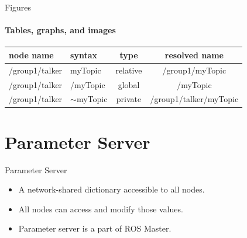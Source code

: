 \documentclass{beamer}
\begin{document}
    \begin{frame}[label=figs1]{Figures}
        \framesubtitle{Tables, graphs, and images}
        \begin{table}[!b]
            \begin{tabularx}{\textwidth}{XXcc}
                \textbf{node name} & \textbf{syntax} &\textbf{type} & \textbf{resolved name} \\
                \toprule
                /group1/talker & {\ttfamily \colorbox{gray!30!white}{myTopic}} & relative  & /group1/myTopic \\
                /group1/talker & {\ttfamily \colorbox{gray!30!white}{/myTopic}} & global  & /myTopic \\
                /group1/talker & {\ttfamily \colorbox{gray!30!white}{$\sim$myTopic}} & private  &  /group1/talker/myTopic \\                
                \bottomrule
            \end{tabularx}%
        \end{table}
    \end{frame}

\section{Parameter Server}

\begin{frame}{Parameter Server}
    \begin{itemize}
        \item A network-shared dictionary accessible to all nodes.
        \item  All nodes can access and modify those values.
        \item Parameter server is a part of ROS Master.
    \end{itemize}  
\end{frame}
\end{document}
